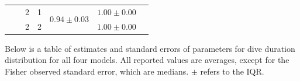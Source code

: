 \documentclass[12pt]{TD-CJS}
\begin{document}
{\begin{tabular}{ccccccc}
                           &                                    & 2                             & 1                                & \multirow{2}{*}{$0.94\pm0.03$}    & $1.00 \pm 0.00$                       \\ 
                           &                                    & 2                             & 2                                &                                   & $1.00 \pm 0.00$                       \\ \hline
\end{tabular}
}


\newpage
Below is a table of estimates and standard errors of parameters for dive duration distribution for all four models. All reported values are averages, except for the Fisher observed standard error, which are medians. $\pm$ refers to the IQR.
\vspace{1cm}
\end{document}
